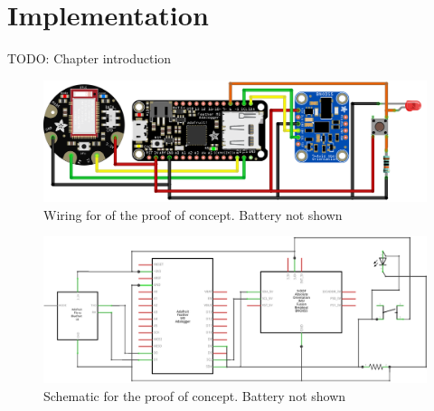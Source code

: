 \chapter{Implementation}

TODO: Chapter introduction






\begin{figure}[h!]
    \centering
    \includegraphics[scale=1]{figures/Sketch_bb.png}
    \caption{Wiring for of the proof of concept. Battery not shown}
    \label{sketch_bb}
\end{figure}

\begin{figure}[h!]
    \centering
    \includegraphics[scale=1]{figures/Sketch_schem.png}
    \caption{Schematic for the proof of concept. Battery not shown}
    \label{sketch_schem}
\end{figure}

